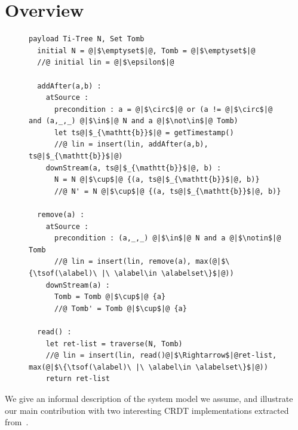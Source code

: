 \section{Overview}
\label{sec:overview}

\begin{figure}[t]
\begin{lstlisting}[basicstyle=\ttfamily\scriptsize,caption={Replicated Growing Array (RGA) CRDT pseudo-code.},captionpos=b,label={lst:rga}]
  payload Ti-Tree N, Set Tomb
  initial N = @|$\emptyset$|@, Tomb = @|$\emptyset$|@
  //@ initial lin = @|$\epsilon$|@

  addAfter(a,b) :
    atSource :
      precondition : a = @|$\circ$|@ or (a != @|$\circ$|@ and (a,_,_) @|$\in$|@ N and a @|$\not\in$|@ Tomb)
      let ts@|$_{\mathtt{b}}$|@ = getTimestamp()
      //@ lin = insert(lin, addAfter(a,b), ts@|$_{\mathtt{b}}$|@)
    downStream(a, ts@|$_{\mathtt{b}}$|@, b) :
      N = N @|$\cup$|@ {(a, ts@|$_{\mathtt{b}}$|@, b)}
      //@ N' = N @|$\cup$|@ {(a, ts@|$_{\mathtt{b}}$|@, b)}

  remove(a) :
    atSource :
      precondition : (a,_,_) @|$\in$|@ N and a @|$\notin$|@ Tomb
      //@ lin = insert(lin, remove(a), max(@|$\{\tsof(\alabel)\ |\ \alabel\in \alabelset\}$|@))
    downStream(a) :
      Tomb = Tomb @|$\cup$|@ {a}
      //@ Tomb' = Tomb @|$\cup$|@ {a}

  read() :
    let ret-list = traverse(N, Tomb)
    //@ lin = insert(lin, read()@|$\Rightarrow$|@ret-list, max(@|$\{\tsof(\alabel)\ |\ \alabel\in \alabelset\}$|@))
    return ret-list
\end{lstlisting}
\end{figure}

We give an informal description of the system model
we assume, and illustrate our main contribution with two
interesting CRDT implementations extracted from~\cite{AttiyaBGMYZ16,ShapiroPBZ11}.

